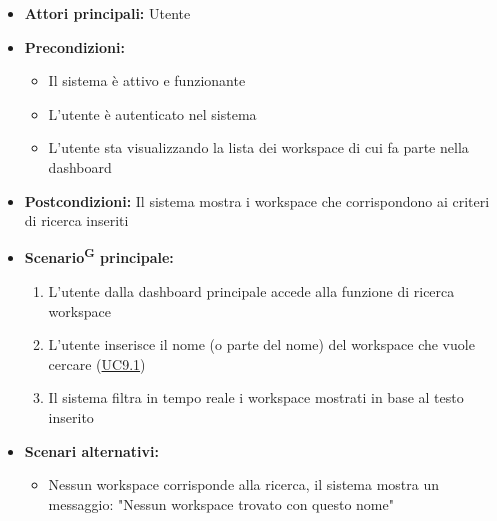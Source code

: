 \documentclass[a4paper, 11pt]{article}
\begin{document}
\begin{itemize}
	\item \textbf{Attori principali:} Utente
	\item \textbf{Precondizioni:}
	\begin{itemize}
		\item Il sistema è attivo e funzionante
		\item L'utente è autenticato nel sistema
        \item L'utente sta visualizzando la lista dei workspace di cui fa parte nella dashboard
	\end{itemize}
    \item \textbf{Postcondizioni:} Il sistema mostra i workspace che corrispondono ai criteri di ricerca inseriti
	\item \textbf{Scenario\textsuperscript{G} principale:}
    \begin{enumerate}
        \item L'utente dalla dashboard principale accede alla funzione di ricerca workspace
        \item L'utente inserisce il nome (o parte del nome) del workspace che vuole cercare (\hyperref[UC9.1]{UC9.1})
        \item Il sistema filtra in tempo reale i workspace mostrati in base al testo inserito
    \end{enumerate}
    \item \textbf{Scenari alternativi:}
    \begin{itemize}
		\item Nessun workspace corrisponde alla ricerca, il sistema mostra un messaggio: "Nessun workspace trovato con questo nome"
	\end{itemize}
\end{itemize}
\end{document}
